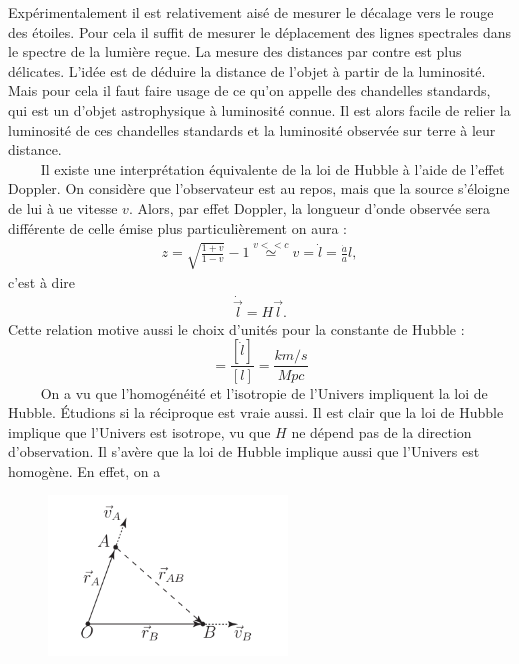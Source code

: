\documentclass[a4paper,12pt]{report}
\theoremstyle{plain}
\theoremstyle{plain}
\begin{document}
      	
      	\qquad Exp\'erimentalement il est relativement ais\'e de mesurer le d\'ecalage vers le rouge des \'etoiles. Pour cela il suffit de mesurer le d\'eplacement des lignes spectrales dans le spectre de la lumi\`ere re\c{c}ue. La mesure des distances par contre est plus d\'elicates. L'id\'ee est de d\'eduire la distance de l'objet \`a partir de la luminosit\'e. Mais pour cela il faut faire usage de ce qu'on appelle des chandelles standards, qui est un d'objet astrophysique \`a luminosit\'e connue. Il est alors facile de relier la luminosit\'e de ces chandelles standards et la luminosit\'e observ\'ee sur terre \`a leur distance.\\
      	
      	$\qquad$ Il existe une interpr\'etation \'equivalente de la loi de Hubble \`a l'aide de l'effet Doppler. On consid\`ere que l'observateur est au repos, mais que la source s'\'eloigne de lui \`a ue vitesse $v$. Alors, par effet Doppler, la longueur d'onde observ\'ee sera diff\'erente de celle \'emise  plus particuli\`erement on aura :
      	\begin{eqnarray}
z=\sqrt{\frac{1+v}{1-v}}-1 \overset{v<<c}{\simeq} v = \dot{l} = \frac{\dot{a}}{a} l, 
\end{eqnarray}
      	c'est \`a dire
     	\begin{eqnarray} 
     	\dot{\overrightarrow{l}} =H \overrightarrow{l}.
     	\end{eqnarray}
      	Cette relation motive aussi le choix d'unit\'es pour la constante de Hubble :
      	\begin{equation}
      	[H]=\frac{[\dot{l}]}{[l]}= \frac{km/s}{Mpc}
      	\end{equation} 
      	$\qquad$ On a vu que l'homog\'en\'eit\'e et l'isotropie de l'Univers impliquent la loi de Hubble. \'{E}tudions si la r\'eciproque est vraie aussi. Il est clair que la loi de Hubble implique que l'Univers est isotrope, vu que $H$ ne d\'epend pas de la direction d'observation. Il s'av\`ere que la loi de Hubble implique aussi que l'Univers est homog\`ene.
      	En effet, on a 
      	
      	     \begin{figure}[h]
\includegraphics[width=15pc]{t5.png}
\caption{}
\end{figure}
      	
\end{document}
